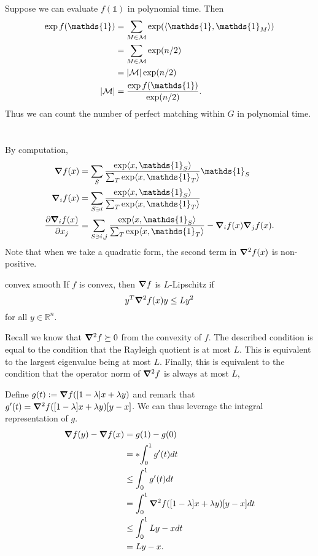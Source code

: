 \documentclass[10pt]{article}
\DeclarePairedDelimiter{\iprod}{\langle}{\rangle}
\DeclarePairedDelimiter{\card}{\lvert}{\rvert}
\let\norm\relax
\DeclarePairedDelimiter{\norm}{\lVert}{\rVert}
\newcommand{\ones}{\mathds{1}}
\newcommand{\R}{\mathbb{R}}
\newcommand{\mcal}{\mathcal}
\begin{document}
\subsection{}
Suppose we can evaluate $f(\ones)$ in polynomial time.
Then
\begin{align*}
  \exp f(\ones)
  &= \sum_{M\in \mcal M} \exp(\iprod{\ones, \ones_M}) \\
  &= \sum_{M\in \mcal M} \exp(n/2) \\
  &= \card{\mcal M} \exp(n/2) \\
  \card{\mcal M}
  &= \frac{\exp f(\ones)}{\exp(n/2)}.
\end{align*}
Thus we can count the number of perfect matching within $G$ in polynomial time.

\clearpage
\section{}
By computation,
\begin{align*}
  \grad f(x)
  &= \sum_S \frac{\exp\iprod{x, \ones_S}}{\sum_T \exp\iprod{x, \ones_T}} \ones_S \\
  \grad_i f(x)
  &= \sum_{S\ni i} \frac{\exp\iprod{x, \ones_S}}{\sum_T \exp\iprod{x, \ones_T}} \\
  \frac{\partial \grad_i f(x)}{\partial x_j}
  &= \sum_{S\ni i, j} \frac{\exp\iprod{x, \ones_S}}{\sum_T \exp\iprod{x, \ones_T}} - \grad_i f(x)\grad_j f(x).
\end{align*}
Note that when we take a quadratic form,
the second term in $\grad^2 f(x)$ is non-positive.

\begin{lem}{}{convex smooth}
  If $f$ is convex,
  then $\grad f$ is $L$-Lipschitz
  if
  \[
    y^T\grad^2 f(x)y \leq L\norm{y}^2
  \]
  for all $y\in \R^n$.
\end{lem}

\begin{pf}{}{}
  Recall we know that $\grad^2 f\succeq 0$ from the convexity of $f$.
  The described condition is equal to the condition that the Rayleigh quotient is at most $L$.
  This is equivalent to the largest eigenvalue being at most $L$.
  Finally,
  this is equivalent to the condition that the operator norm of $\grad^2 f$ is always at most $L$,

  Define $g(t) := \grad f([1-\lambda]x + \lambda y)$
  and remark that $g'(t) = \grad^2 f([1-\lambda]x + \lambda y) [y-x]$.
  We can thus leverage the integral representation of $g$.
  \begin{align*}
    \norm{\grad f(y) - \grad f(x)}
    &= \norm{g(1) - g(0)} \\
    &= \norm*{\int_0^1 g'(t) dt} \\
    &\leq \int_0^1 \norm{g'(t)} dt \\
    &= \int_0^1 \norm{\grad^2 f([1-\lambda]x + \lambda y) [y-x]} dt \\
    &\leq \int_0^1 L\norm{y-x} dt \\
    &= L\norm{y-x}.
  \end{align*}
\end{pf}
\end{document}
